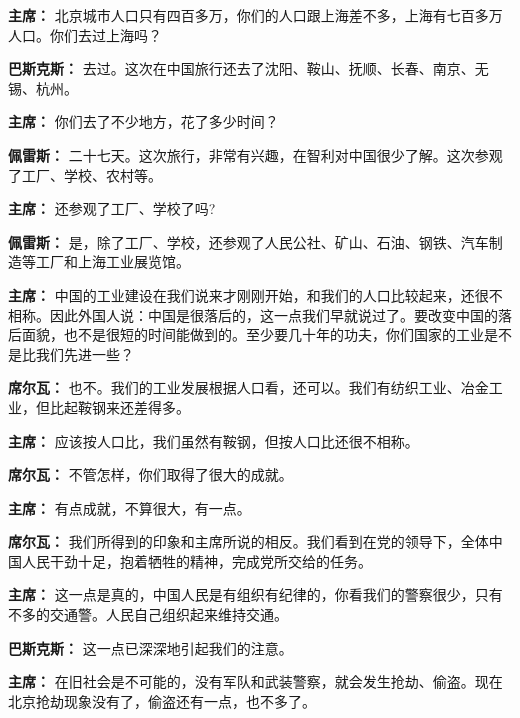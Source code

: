 \begin{duihua}
\item[\textbf{主席：}] 北京城市人口只有四百多万，你们的人口跟上海差不多，上海有七百多万人口。你们去过上海吗？

\item[\textbf{巴斯克斯：}] 去过。这次在中国旅行还去了沈阳、鞍山、抚顺、长春、南京、无锡、杭州。

\item[\textbf{主席：}] 你们去了不少地方，花了多少时间？

\item[\textbf{佩雷斯：}] 二十七天。这次旅行，非常有兴趣，在智利对中国很少了解。这次参观了工厂、学校、农村等。

\item[\textbf{主席：}] 还参观了工厂、学校了吗?

\item[\textbf{佩雷斯：}] 是，除了工厂、学校，还参观了人民公社、矿山、石油、钢铁、汽车制造等工厂和上海工业展览馆。

\item[\textbf{主席：}]中国的工业建设在我们说来才刚刚开始，和我们的人口比较起来，还很不相称。因此外国人说：中国是很落后的，这一点我们早就说过了。要改变中国的落后面貌，也不是很短的时间能做到的。至少要几十年的功夫，你们国家的工业是不是比我们先进一些？

\item[\textbf{席尔瓦：}] 也不。我们的工业发展根据人口看，还可以。我们有纺织工业、冶金工业，但比起鞍钢来还差得多。

\item[\textbf{主席：}] 应该按人口比，我们虽然有鞍钢，但按人口比还很不相称。

\item[\textbf{席尔瓦：}]不管怎样，你们取得了很大的成就。

\item[\textbf{主席：}] 有点成就，不算很大，有一点。

\item[\textbf{席尔瓦：}] 我们所得到的印象和主席所说的相反。我们看到在党的领导下，全体中国人民干劲十足，抱着牺牲的精神，完成党所交给的任务。

\item[\textbf{主席：}] 这一点是真的，中国人民是有组织有纪律的，你看我们的警察很少，只有不多的交通警。人民自己组织起来维持交通。

\item[\textbf{巴斯克斯：}] 这一点已深深地引起我们的注意。

\item[\textbf{主席：}] 在旧社会是不可能的，没有军队和武装警察，就会发生抢劫、偷盗。现在北京抢劫现象没有了，偷盗还有一点，也不多了。


\end{duihua}
